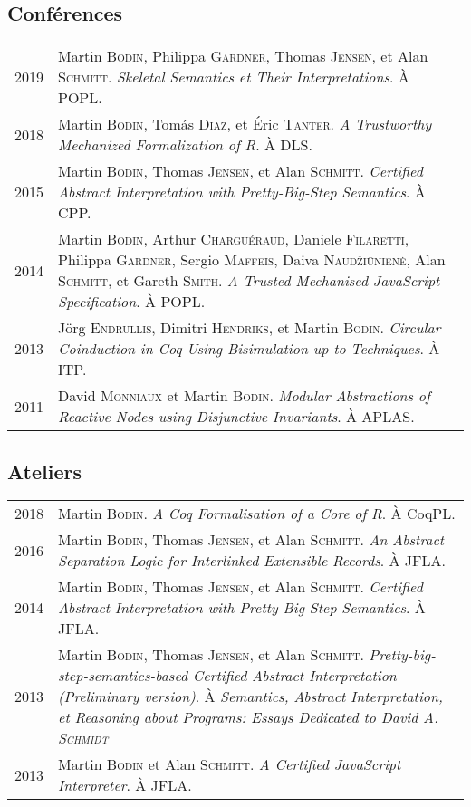 \documentclass[12pt,a4paper]{article}
\makeatletter
\newenvironment{datecvsection}[1]%
               {\subsection*{#1}%
                 \noindent \begin{tabular}{@{}p{\annee}p{\texte}@{}}}
               {\end{tabular}}
\makeatother
\begin{document}
\begin{datecvsection}{Conférences}

  2019 & Martin \textsc{Bodin}, Philippa \textsc{Gardner}, Thomas \textsc{Jensen}, et Alan \textsc{Schmitt}. \textit{Skeletal Semantics et Their Interpretations}. À POPL. \\

  2018 & Martin \textsc{Bodin}, Tomás \textsc{Diaz}, et Éric \textsc{Tanter}. \textit{A Trustworthy Mechanized Formalization of R}. À DLS. \\

  2015 & Martin \textsc{Bodin}, Thomas \textsc{Jensen}, et Alan \textsc{Schmitt}. \textit{Certified Abstract Interpretation with Pretty-Big-Step Semantics}. À CPP. \\

  2014 & Martin \textsc{Bodin}, Arthur \textsc{Charguéraud}, Daniele \textsc{Filaretti}, Philippa \textsc{Gardner}, Sergio \textsc{Maffeis}, Daiva \textsc{Naudžiūnienė}, Alan \textsc{Schmitt}, et Gareth \textsc{Smith}. \textit{A Trusted Mechanised JavaScript Specification}. À POPL. \\

  2013 & Jörg \textsc{Endrullis}, Dimitri \textsc{Hendriks}, et Martin \textsc{Bodin}. \textit{Circular Coinduction in Coq Using Bisimulation-up-to Techniques}. À ITP. \\

  2011 & David \textsc{Monniaux} et Martin \textsc{Bodin}. \textit{Modular Abstractions of Reactive Nodes using Disjunctive Invariants}. À APLAS. \\

\end{datecvsection}

\begin{datecvsection}{Ateliers}

  2018 & Martin \textsc{Bodin}. \textit{A Coq Formalisation of a Core of R}. À CoqPL. \\

  2016 & Martin \textsc{Bodin}, Thomas \textsc{Jensen}, et Alan \textsc{Schmitt}. \textit{An Abstract Separation Logic for Interlinked Extensible Records}. À JFLA. \\

  2014 & Martin \textsc{Bodin}, Thomas \textsc{Jensen}, et Alan \textsc{Schmitt}. \textit{Certified Abstract Interpretation with Pretty-Big-Step Semantics}. À JFLA. \\

  2013 & Martin \textsc{Bodin}, Thomas \textsc{Jensen}, et Alan \textsc{Schmitt}. \textit{Pretty-big-step-semantics-based Certified Abstract Interpretation (Preliminary version)}. À \textit{Semantics, Abstract Interpretation, et Reasoning about Programs: Essays Dedicated to David A. \textsc{Schmidt}} \\ %

  2013 & Martin \textsc{Bodin} et Alan \textsc{Schmitt}. \textit{A Certified JavaScript Interpreter}. À JFLA. \\

\end{datecvsection}
\end{document}
